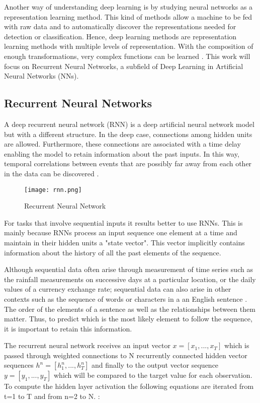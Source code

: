 Another way of understanding deep learning is by studying neural networks as a representation learning method. This kind of methods allow a machine to be fed with raw data and to automatically discover the representations needed for detection or classification. Hence, deep learning methods are representation learning methods with multiple levels of representation. With the composition of enough transformations, very complex functions can be learned \cite{lecun2015deep}. This work will focus on Recurrent Neural Networks, a subfield of Deep Learning in Artificial Neural Networks (NNs).


\subsection{Recurrent Neural Networks}

A deep recurrent neural network (RNN) is a deep artificial neural network model but with a different structure. In the deep case, connections among hidden units are allowed. Furthermore, these connections are associated with a time delay enabling the model to retain information about the past inputs. In this way, temporal correlations between events that are possibly far away from each other in the data can be discovered \cite{pascanu2013difficulty}.

\begin{figure}
\label{fig:rnn}
\center
\texttt{[image: rnn.png]}
\caption{Recurrent Neural Network}
\end{figure}
For tasks that involve sequential inputs it results better to use RNNs. This is mainly because RNNs process an input sequence one element at a time and maintain in their hidden units a "state vector". This vector implicitly contains information about the history of all the past elements of the sequence.\cite{lecun2015deep} 

Although sequential data often arise through measurement of time series such as the rainfall measurements on successive days at a particular location, or the daily values of a currency exchange rate; sequential data can also arise in other contexts such as the sequence of words or characters in a an English sentence \cite{bishop2006pattern}. The order of the elements of a sentence as well as the relationships between them matter. Thus, to predict which is the most likely element to follow the sequence, it is important to retain this information.

The recurrent neural network receives an input vector $x=[x_1,...,x_T]$ which is passed through weighted connections to N recurrently connected hidden vector sequences $h^n=[h_1^n,...,h_T^n]$ and finally to the output vector sequence $y=[y_1,...,y_T]$ which will be compared to the target value for each observation. To compute the hidden layer activation the following equations are iterated from t=1 to T and from n=2 to N. \cite{graves2013generating}:

